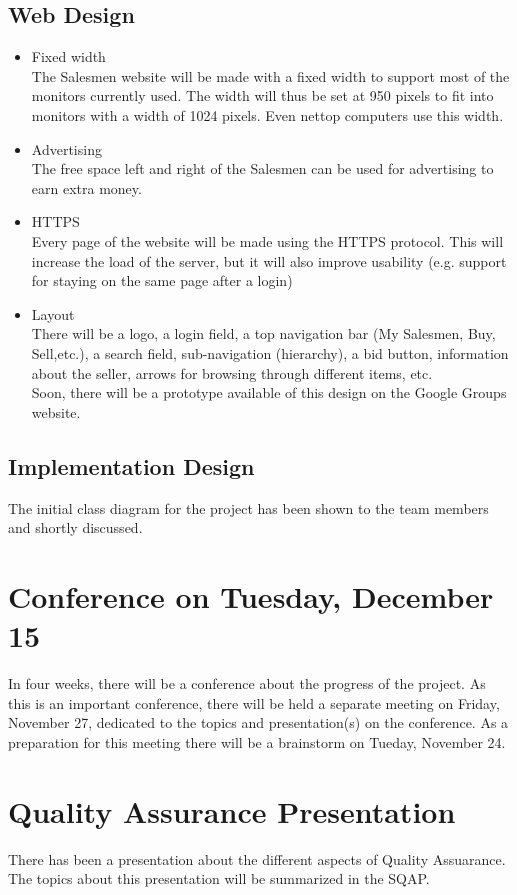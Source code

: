 \documentclass[a4paper, 12pt]{article}
\begin{document}
		\subsection{Web Design}
		\begin{itemize}
		\item Fixed width \\
The Salesmen website will be made with a fixed width to support most of the monitors currently used. The width will thus be set at 950 pixels to fit into monitors with a width of 1024 pixels. Even nettop computers use this width.
		\item Advertising \\
The free space left and right of the Salesmen can be used for advertising to earn extra money.
		\item HTTPS \\
Every page of the website will be made using the HTTPS protocol. This will increase the load of the server, but it will also improve usability (e.g. support for staying on the same page after a login)
		\item Layout \\
There will be a logo, a login field, a top navigation bar (My Salesmen, Buy, Sell,etc.), a search field, sub-navigation (hierarchy), a bid button, information about the seller, arrows for browsing through different items, etc. \\
Soon, there will be a prototype available of this design on the Google Groups website.
		\end{itemize}

		\subsection{Implementation Design}
The initial class diagram for the project has been shown to the team members and shortly discussed.

	\section{Conference on Tuesday, December 15}
In four weeks, there will be a conference about the progress of the  project. As this is an important conference, there will be held a separate meeting  on Friday, November 27, dedicated to the topics and presentation(s) on the conference. As a preparation for this meeting there will be a brainstorm on Tueday, November 24.

	\section{Quality Assurance Presentation}
There has been a presentation about the different aspects of Quality Assuarance. The topics about this presentation will be summarized in the SQAP.
\end{document}
